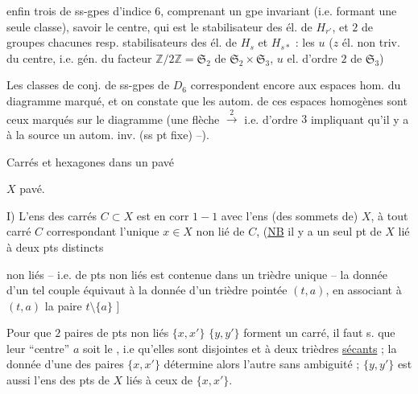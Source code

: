 enfin trois   de ss-gpes  d'indice $6$,  comprenant un gpe invariant (i.e. formant une seule classe), savoir le centre, qui est le stabilisateur des él. de $H_{r'}$, et $2$   de groupes chacunes  resp. stabilisateurs des él. de $H_s$ et $H_{s*}$ : les \deleted{\unsure{$\varepsilon$}} $u$  ($z$ él. non triv. du centre, i.e. gén. du facteur $\mathbb Z/2\mathbb Z=\mathfrak S_2$ de $\mathfrak S_2\times\mathfrak S_3$, $u$ el. d'ordre $2$ de $\mathfrak S_3$)  

Les classes de conj. de ss-gpes de $D_6$ correspondent encore  aux  espaces hom. du diagramme marqué, et on constate que les autom. de ces espaces homogènes sont ceux marqués sur le diagramme (une flèche $\xrightarrow{2}$ i.e. d'ordre $3$ impliquant qu'il y a à la source un autom. inv. (ss pt fixe) --).


Carrés et hexagones dans un pavé

$X$ pavé.

I) L'ens des carrés $C\subset X$ est en corr $1-1$ avec l'ens (des sommets de) $X$, à tout carré $C$ correspondant l'unique $x\in X$ non lié   de $C$,  (\uline{NB} il y a un seul pt de $X$  lié à  deux pts distincts


non liés -- i.e.    de pts  non liés est contenue dans un trièdre unique -- la donnée d'un tel couple équivaut  à la donnée d'un trièdre pointée $(t,a)$, en associant à $(t,a)$ la paire $t\setminus\{a\}$ ]

Pour que $2$ paires de pts non liés $\{x,x'\}$ $\{y,y'\}$ forment un carré, il faut s. que  leur ``centre'' $a$ soit le , i.e qu'elles sont disjointes et  à deux trièdres \uline{sécants} ; la donnée d'une  des paires $\{x,x'\}$ détermine alors l'autre sans ambiguité ; $\{y,y'\}$ est aussi l'ens des pts de $X$ liés à ceux de $\{x,x'\}$.

